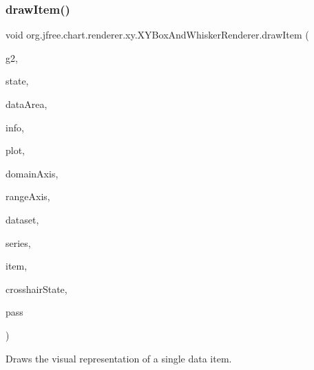 \subsubsection{\texorpdfstring{draw\+Item()}{drawItem()}}
{\footnotesize\ttfamily void org.\+jfree.\+chart.\+renderer.\+xy.\+X\+Y\+Box\+And\+Whisker\+Renderer.\+draw\+Item (\begin{DoxyParamCaption}\item[{Graphics2D}]{g2,  }\item[{\mbox{\hyperlink{classorg_1_1jfree_1_1chart_1_1renderer_1_1xy_1_1_x_y_item_renderer_state}{X\+Y\+Item\+Renderer\+State}}}]{state,  }\item[{Rectangle2D}]{data\+Area,  }\item[{\mbox{\hyperlink{classorg_1_1jfree_1_1chart_1_1plot_1_1_plot_rendering_info}{Plot\+Rendering\+Info}}}]{info,  }\item[{\mbox{\hyperlink{classorg_1_1jfree_1_1chart_1_1plot_1_1_x_y_plot}{X\+Y\+Plot}}}]{plot,  }\item[{\mbox{\hyperlink{classorg_1_1jfree_1_1chart_1_1axis_1_1_value_axis}{Value\+Axis}}}]{domain\+Axis,  }\item[{\mbox{\hyperlink{classorg_1_1jfree_1_1chart_1_1axis_1_1_value_axis}{Value\+Axis}}}]{range\+Axis,  }\item[{\mbox{\hyperlink{interfaceorg_1_1jfree_1_1data_1_1xy_1_1_x_y_dataset}{X\+Y\+Dataset}}}]{dataset,  }\item[{int}]{series,  }\item[{int}]{item,  }\item[{\mbox{\hyperlink{classorg_1_1jfree_1_1chart_1_1plot_1_1_crosshair_state}{Crosshair\+State}}}]{crosshair\+State,  }\item[{int}]{pass }\end{DoxyParamCaption})}

Draws the visual representation of a single data item.


